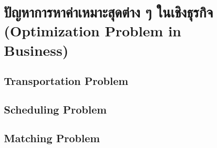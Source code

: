 \chapter{ปัญหาการหาค่าเหมาะสุดต่าง ๆ ในเชิงธุรกิจ (Optimization Problem in Business)}
\section{Transportation Problem}
\section{Scheduling Problem}
\section{Matching Problem}

